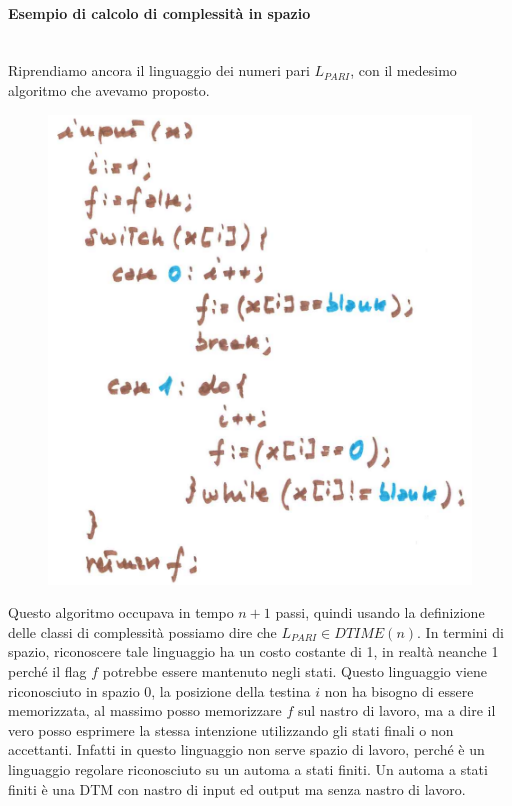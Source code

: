 \documentclass{article}
\begin{document}
\paragraph{Esempio di calcolo di complessità in spazio}\mbox{}\\
Riprendiamo ancora il linguaggio dei numeri pari $L_{PARI}$, con il medesimo
algoritmo che avevamo proposto.
\begin{figure}[H]
    \centering
    \includegraphics[scale=0.5]{images/prog_pari.png}
\end{figure}
Questo algoritmo occupava in tempo $n+1$ passi, quindi usando la definizione delle
classi di complessità possiamo dire che $L_{PARI}\in DTIME(n)$. In termini di spazio,
riconoscere tale linguaggio ha un costo costante di 1, in realtà neanche 1 perché
il flag $f$ potrebbe essere mantenuto negli stati. Questo linguaggio viene riconosciuto
in spazio 0, la posizione della testina $i$ non ha bisogno di essere memorizzata,
al massimo posso memorizzare $f$ sul nastro di lavoro, ma a dire il vero posso
esprimere la stessa intenzione utilizzando gli stati finali o non accettanti. Infatti
in questo linguaggio non serve spazio di lavoro, perché è un linguaggio regolare
riconosciuto su un automa a stati finiti. Un automa a stati finiti è una DTM
con nastro di input ed output ma senza nastro di lavoro.
\end{document}
